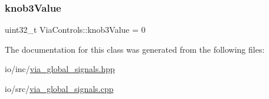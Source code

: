\mbox{\label{class_via_controls_ac721e5fd2a1dfae09a4ae9e8377698cd}} 
\subsubsection{\texorpdfstring{knob3\+Value}{knob3Value}}
{\footnotesize\ttfamily uint32\+\_\+t Via\+Controls\+::knob3\+Value = 0}



The documentation for this class was generated from the following files\+:\begin{DoxyCompactItemize}
\item 
io/inc/\mbox{\hyperlink{via__global__signals_8hpp}{via\+\_\+global\+\_\+signals.\+hpp}}\item 
io/src/\mbox{\hyperlink{via__global__signals_8cpp}{via\+\_\+global\+\_\+signals.\+cpp}}\end{DoxyCompactItemize}
